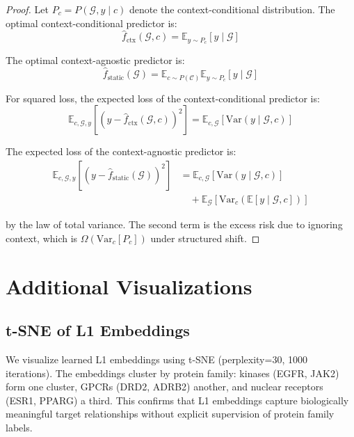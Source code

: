 \documentclass[sigconf]{acmart}
\begin{document}
\begin{proof}
Let $P_c = P(\mathcal{G}, y \mid c)$ denote the context-conditional distribution. The optimal context-conditional predictor is:
\begin{equation}
    \hat{f}_{\text{ctx}}(\mathcal{G}, c) = \mathbb{E}_{y \sim P_c}[y \mid \mathcal{G}]
\end{equation}

The optimal context-agnostic predictor is:
\begin{equation}
    \hat{f}_{\text{static}}(\mathcal{G}) = \mathbb{E}_{c \sim P(\mathcal{C})} \mathbb{E}_{y \sim P_c}[y \mid \mathcal{G}]
\end{equation}

For squared loss, the expected loss of the context-conditional predictor is:
\begin{equation}
    \mathbb{E}_{c, \mathcal{G}, y}[(y - \hat{f}_{\text{ctx}}(\mathcal{G}, c))^2] = \mathbb{E}_{c, \mathcal{G}}[\mathrm{Var}(y \mid \mathcal{G}, c)]
\end{equation}

The expected loss of the context-agnostic predictor is:
\begin{align}
    \mathbb{E}_{c, \mathcal{G}, y}[(y - \hat{f}_{\text{static}}(\mathcal{G}))^2] &= \mathbb{E}_{c, \mathcal{G}}[\mathrm{Var}(y \mid \mathcal{G}, c)] \\
    &\quad + \mathbb{E}_{\mathcal{G}}[\mathrm{Var}_c(\mathbb{E}[y \mid \mathcal{G}, c])]
\end{align}

by the law of total variance. The second term is the excess risk due to ignoring context, which is $\Omega(\mathrm{Var}_c[P_c])$ under structured shift.
\end{proof}

\section{Additional Visualizations}
\label{app:visualizations}

\subsection{t-SNE of L1 Embeddings}

We visualize learned L1 embeddings using t-SNE (perplexity=30, 1000 iterations). The embeddings cluster by protein family: kinases (EGFR, JAK2) form one cluster, GPCRs (DRD2, ADRB2) another, and nuclear receptors (ESR1, PPARG) a third. This confirms that L1 embeddings capture biologically meaningful target relationships without explicit supervision of protein family labels.
\end{document}
